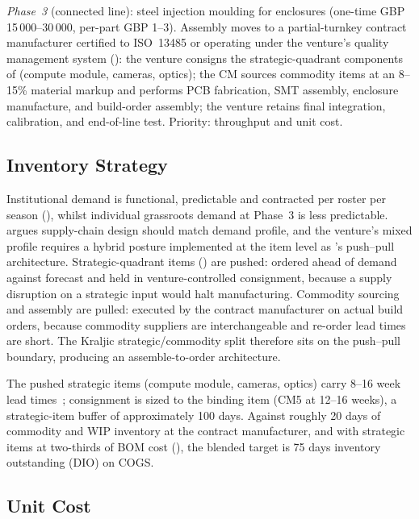\textit{Phase~3} (connected line): steel injection moulding for enclosures (one-time GBP 15\,000--30\,000, per-part GBP 1--3). Assembly moves to a partial-turnkey contract manufacturer certified to ISO~13485 or operating under the venture's quality management system (): the venture consigns the strategic-quadrant components of  (compute module, cameras, optics); the CM sources commodity items at an 8--15\% material markup and performs PCB fabrication, SMT assembly, enclosure manufacture, and build-order assembly; the venture retains final integration, calibration, and end-of-line test. Priority: throughput and unit cost.


\subsection{Inventory Strategy}
\label{sec:ent-inventory}

Institutional demand is functional, predictable and contracted per roster per season (), whilst individual grassroots demand at Phase~3 is less predictable. \citet{fisher1997supplychain} argues supply-chain design should match demand profile, and the venture's mixed profile requires a hybrid posture implemented at the item level as \citet{chopra2016supply}'s push--pull architecture. Strategic-quadrant items () are pushed: ordered ahead of demand against forecast and held in venture-controlled consignment, because a supply disruption on a strategic input would halt manufacturing. Commodity sourcing and assembly are pulled: executed by the contract manufacturer on actual build orders, because commodity suppliers are interchangeable and re-order lead times are short. The Kraljic strategic/commodity split therefore sits on the push--pull boundary, producing an assemble-to-order architecture.

The pushed strategic items (compute module, cameras, optics) carry 8--16 week lead times~\cite{rpi-cm5-source, arducam-ov9281-source, edmund-optics-source}; consignment is sized to the binding item (CM5 at 12--16 weeks), a strategic-item buffer of approximately 100 days. Against roughly 20 days of commodity and WIP inventory at the contract manufacturer, and with strategic items at two-thirds of BOM cost (), the blended target is 75 days inventory outstanding (DIO) on COGS.


\subsection{Unit Cost}
\label{sec:ent-unit-cost}
\label{sec:ent-bom}

